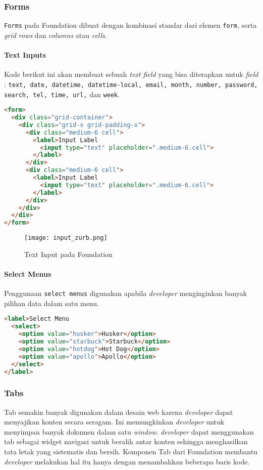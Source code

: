 \begin{itemize}
\subsubsection{Forms}
\texttt{Forms} pada Foundation dibuat dengan kombinasi standar dari elemen \texttt{form}, serta \textit{grid rows} dan \textit{columns} atau \textit{cells}. 

\paragraph{Text Inputs}
Kode berikut ini akan membuat sebuah \textit{text field} yang bisa diterapkan untuk \textit{field} : \texttt{text, date, datetime, datetime-local, email, month, number, password, search, tel, time, url,} dan \texttt{week}.

\begin{lstlisting}[language=HTML, frame=single, basicstyle=\small] 
<form>
  <div class="grid-container">
    <div class="grid-x grid-padding-x">
      <div class="medium-6 cell">
        <label>Input Label
          <input type="text" placeholder=".medium-6.cell">
        </label>
      </div>
      <div class="medium-6 cell">
        <label>Input Label
          <input type="text" placeholder=".medium-6.cell">
        </label>
      </div>
    </div>
  </div>
</form>
\end{lstlisting}

\begin{figure} [H]
	\centering  
	\texttt{[image: input\_zurb.png]}  
	\caption{Text Input pada Foundation}
	\label{fig:gridbasic_zurb} 
\end{figure}

\paragraph{Select Menus}
Penggunaan \texttt{select menus} digunakan apabila \textit{developer} menginginkan banyak pilihan data dalam satu menu.
\begin{lstlisting}[language=HTML, frame=single, basicstyle=\small] 
<label>Select Menu
  <select>
    <option value="husker">Husker</option>
    <option value="starbuck">Starbuck</option>
    <option value="hotdog">Hot Dog</option>
    <option value="apollo">Apollo</option>
  </select>
</label>
\end{lstlisting}


\subsubsection{Tabs}
Tab semakin banyak digunakan dalam desain web karena \textit{developer} dapat menyajikan konten secara seragam. Ini memungkinkan \textit{developer} untuk menyimpan banyak dokumen dalam satu \textit{window}. \textit{developer} dapat menggunakan tab sebagai widget navigasi untuk beralih antar konten sehingga menghasilkan tata letak yang sistematis dan bersih. Komponen Tab dari Foundation membantu \textit{developer} melakukan hal itu hanya dengan menambahkan beberapa baris kode. 


\end{itemize}
